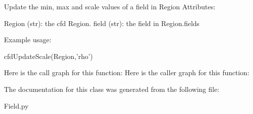 \begin{DoxyVerb}Update the min, max and scale values of a field in Region
Attributes:
    
   Region (str): the cfd Region.
   field (str): the field in Region.fields
   
Example usage:
    
    cfdUpdateScale(Region,'rho')
\end{DoxyVerb}
 Here is the call graph for this function\+:
Here is the caller graph for this function\+:


The documentation for this class was generated from the following file\+:\begin{DoxyCompactItemize}
\item 
Field.\+py\end{DoxyCompactItemize}
